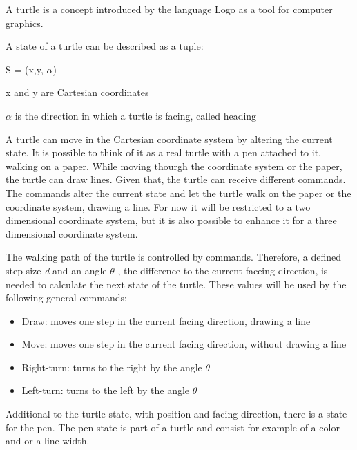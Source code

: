 \documentclass[english]{cpp-hmwk}
\begin{document}
\noindent A turtle is a concept introduced by the language Logo as a tool for computer graphics.\cite[Cf. Chapter 10, p.~179]{harvey1997computer}

\noindent A state of a turtle can be described as a tuple\cite[Cf. Chapter 1.3, p.~6ff]{prusinkiewiczp.lindenmayera.2004}:

\begin{center}
S = (x,y, $\alpha$)
\end{center}

x and y are Cartesian coordinates

$\alpha$ is the direction in which a turtle is facing, called heading

\medskip

\noindent A turtle can move in the Cartesian coordinate system by altering the current state. It is possible to think of it as a real turtle with a pen attached to it, walking on a paper. While moving thourgh the coordinate system or the paper, the turtle can draw lines. Given that, the turtle can receive different commands. The commands alter the current state and let the turtle walk on the paper or the coordinate system, drawing a line. For now it will be restricted to a two dimensional coordinate system, but it is also possible to enhance it for a three dimensional coordinate system.

\medskip

\noindent The walking path of the turtle is controlled by commands. Therefore, a defined step size \textit{d} and an angle \textit{$\theta$ }, the difference to the current faceing direction, is needed to calculate the next state of the turtle. These values will be used by the following general commands: \cite[Cf. Chapter 2]{goldman2004turtle}

\begin{itemize}
\item Draw: moves one step in the current facing direction, drawing a line 
\item Move: moves one step in the current facing direction, without drawing a line
\item Right-turn: turns to the right by the angle $\theta$
\item Left-turn: turns to the left by the angle $\theta$
\end{itemize}

\noindent Additional to the turtle state, with position and facing direction, there is a state for the pen. The pen state is part of a turtle and consist for example of a color and or a line width.
\end{document}
